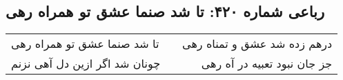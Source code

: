 \begin{center}
\section*{رباعی شماره ۴۲۰: تا شد صنما عشق تو همراه رهی}
\label{sec:sh420}
\begin{longtable}{l p{0.5cm} r}
تا شد صنما عشق تو همراه رهی
&&
درهم زده شد عشق و تمناه رهی
\\
چونان شد اگر ازین دل آهی نزنم
&&
جز جان نبود تعبیه در آه رهی
\\
\end{longtable}
\end{center}
